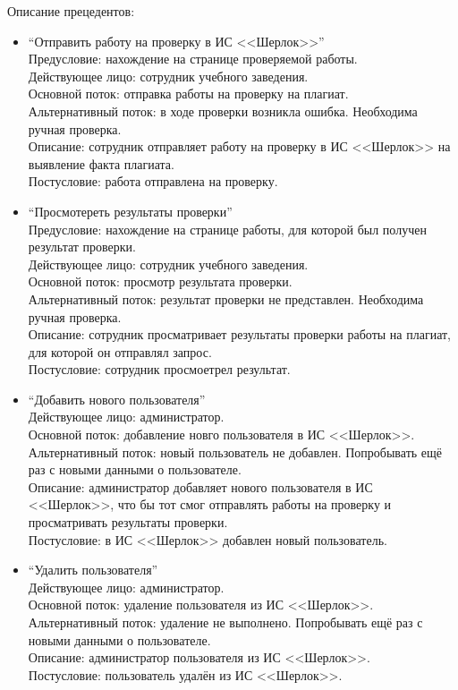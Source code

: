 			Описание прецедентов:
			\begin{itemize}
				\item ``Отправить работу на проверку в ИС <<Шерлок>>'' \\
				Предусловие: нахождение на странице проверяемой работы. \\
				Действующее лицо: сотрудник учебного заведения. \\
				Основной поток: отправка работы на проверку на плагиат. \\
				Альтернативный поток: в ходе проверки возникла ошибка. Необходима ручная проверка. \\
				Описание: сотрудник отправляет работу на проверку в ИС <<Шерлок>> на выявление факта плагиата. \\
				Постусловие: работа отправлена на проверку. \\

				\item ``Просмотереть результаты проверки'' \\
				Предусловие: нахождение на странице работы, для которой был получен результат проверки. \\
				Действующее лицо: сотрудник учебного заведения. \\
				Основной поток: просмотр результата проверки. \\
				Альтернативный поток: результат проверки не представлен. Необходима ручная проверка. \\
				Описание: сотрудник просматривает результаты проверки работы на плагиат, для которой он отправлял запрос. \\
				Постусловие: сотрудник просмоетрел результат. \\

				\item ``Добавить нового пользователя'' \\				
				Действующее лицо: администратор. \\
				Основной поток: добавление новго пользователя в ИС <<Шерлок>>. \\
				Альтернативный поток: новый пользователь не добавлен. Попробывать ещё раз с новыми данными о пользователе. \\
				Описание: администратор добавляет нового пользователя в ИС <<Шерлок>>, что бы тот смог отправлять работы на проверку и просматривать результаты проверки. \\
				Постусловие: в ИС <<Шерлок>> добавлен новый пользователь. \\

				\item ``Удалить пользователя'' \\				
				Действующее лицо: администратор. \\
				Основной поток: удаление пользователя из ИС <<Шерлок>>. \\
				Альтернативный поток: удаление не выполнено. Попробывать ещё раз с новыми данными о пользователе. \\
				Описание: администратор пользователя из ИС <<Шерлок>>. \\
				Постусловие: пользователь удалён из ИС <<Шерлок>>.
			\end{itemize}

